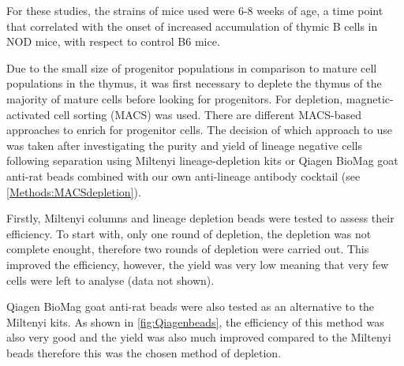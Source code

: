 For these studies, the strains of mice used were 6-8 weeks of age, a time point that correlated with the onset of increased accumulation of thymic B cells in NOD mice, with respect to control B6 mice.




Due to the small size of progenitor populations in comparison to mature cell populations in the thymus, it was first necessary to deplete the thymus of the majority of mature cells before looking for progenitors.
For depletion, magnetic-activated cell sorting (MACS) was used.
There are different MACS-based approaches to enrich for progenitor cells.
The decision of which approach to use was taken after investigating the purity and yield of lineage negative cells following separation using Miltenyi lineage-depletion kits or Qiagen BioMag goat anti-rat beads combined with our own anti-lineage antibody cocktail (see \cref{Methods:MACSdepletion}).


Firstly, Miltenyi columns and lineage depletion beads were tested to assess their efficiency.
To start with, only one round of depletion, the depletion was not complete enought, therefore two rounds of depletion were carried out.
This improved the efficiency, however, the yield was very low meaning that very few cells were left to analyse (data not shown).

Qiagen BioMag goat anti-rat beads were also tested as an alternative to the Miltenyi kits. 
As shown in \cref{fig:Qiagenbeads}, the efficiency of this method was also very good and the yield was also much improved compared to the Miltenyi beads therefore this was the chosen method of depletion.

